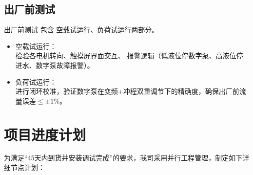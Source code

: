\documentclass[UTF8,a4paper,12pt,titlepage]{ctexart}
\begin{document}
    \subsection{出厂前测试}
    出厂前测试 包含 空载试运行、负荷试运行两部分。
        \begin{itemize}
            \item 空载试运行：\\
                检验各电机转向、触摸屏界面交互、
                报警逻辑（低液位停数字泵、高液位停进水、数字泵故障报警）。
            \item 负荷试运行：\\
                进行闭环校准，验证数字泵在变频+冲程双重调节下的精确度，确保出厂前流量误差$\le \pm1\%$。
        \end{itemize}

\section{项目进度计划}
    为满足“45天内到货并安装调试完成”的要求，我司采用并行工程管理，制定如下详细节点计划：

\end{document}
